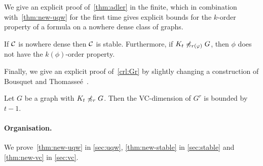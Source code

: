 We give an explicit proof of~\cref{thm:adler} in the finite, 
which in combination with~\cref{thm:new-uqw} for the first time
gives explicit bounds for the $k$-order property of a formula
on a nowhere dense class of graphs. 

\begin{theorem}\label{thm:new-stable}
If $\mathcal{C}$ is nowhere dense then $\mathcal{C}$ is stable. Furthermore, 
if $K_t\not\preccurlyeq_{r(\varphi)} G$, then $\phi$ does not have
the $k(\phi)$-order property.
\end{theorem}

Finally, we give an explicit proof of~\cref{crl:Gr} by slightly
changing a construction of Bousquet and 
Thomasse\'e~\cite{BousquetT15}. 

\begin{theorem}\label{thm:new-vc}
Let $G$ be a graph with $K_t\not\preccurlyeq_r G$. Then 
the VC-dimension of $G^r$ is
bounded by $t-1$. 
\end{theorem}

\paragraph{Organisation.}
We prove~\cref{thm:new-uqw} in \cref{sec:uqw}, 
\cref{thm:new-stable} in \cref{sec:stable} and
\cref{thm:new-vc} in \cref{sec:vc}. 
